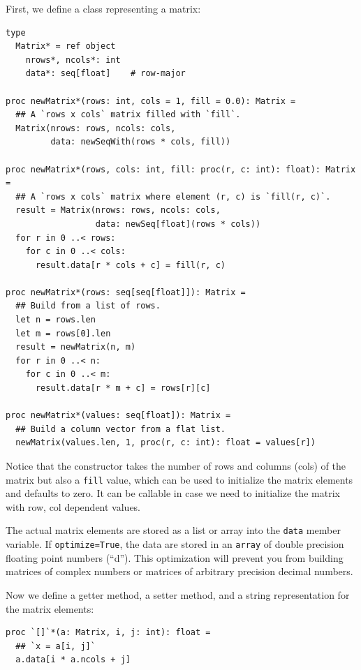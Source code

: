 \documentclass[justified, sixbynine]{tufte-book}
\def\ft{\small\tt}
\theoremstyle{plain}%
\newtheorem * {corollary}{Corollary}
\theoremstyle{definition}
\theoremstyle{remark}
\newtheorem * {remark}{Remark}
\newtheorem * {note}{Note}
\begin{document}
\begin{fullwidth}
First, we define a class representing a matrix:


\begin{lstlisting}[caption={in file: {\ft nlib.nim}}]
type
  Matrix* = ref object
    nrows*, ncols*: int
    data*: seq[float]    # row-major

proc newMatrix*(rows: int, cols = 1, fill = 0.0): Matrix =
  ## A `rows x cols` matrix filled with `fill`.
  Matrix(nrows: rows, ncols: cols,
         data: newSeqWith(rows * cols, fill))

proc newMatrix*(rows, cols: int, fill: proc(r, c: int): float): Matrix =
  ## A `rows x cols` matrix where element (r, c) is `fill(r, c)`.
  result = Matrix(nrows: rows, ncols: cols,
                  data: newSeq[float](rows * cols))
  for r in 0 ..< rows:
    for c in 0 ..< cols:
      result.data[r * cols + c] = fill(r, c)

proc newMatrix*(rows: seq[seq[float]]): Matrix =
  ## Build from a list of rows.
  let n = rows.len
  let m = rows[0].len
  result = newMatrix(n, m)
  for r in 0 ..< n:
    for c in 0 ..< m:
      result.data[r * m + c] = rows[r][c]

proc newMatrix*(values: seq[float]): Matrix =
  ## Build a column vector from a flat list.
  newMatrix(values.len, 1, proc(r, c: int): float = values[r])
\end{lstlisting}

Notice that the constructor takes the number of rows and columns (cols) of the matrix but also a {\ft fill} value, which can be used to initialize the matrix elements and defaults to zero. It can be callable in case we need to initialize the matrix with row, col dependent values.

The actual matrix elements are stored as a list or array into the {\ft data} member variable. If {\ft optimize=True}, the data are stored in an {\ft array} of double precision floating point numbers (``d''). This optimization will prevent you from building matrices of complex numbers or matrices of arbitrary precision decimal numbers.

Now we define a getter method, a setter method, and a string representation for the matrix elements:

\begin{lstlisting}[caption={in file: {\ft nlib.nim}}]
proc `[]`*(a: Matrix, i, j: int): float =
  ## `x = a[i, j]`
  a.data[i * a.ncols + j]


\end{lstlisting}
\end{fullwidth}
\end{document}
